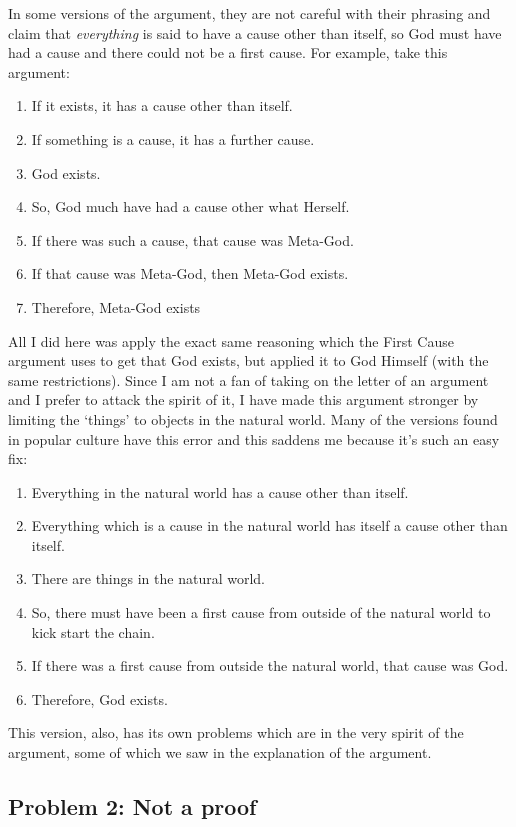 In some versions of the argument, they are not careful with their phrasing and claim that \emph{everything} is said to have a cause other than itself, so God must have had a cause and there could not be a first cause. For example, take this argument:
\begin{enumerate}
   \item If it exists, it has a cause other than itself.
   \item If something is a cause, it has a further cause.
   \item God exists.
   \item So, God much have had a cause other what Herself.
   \item If there was such a cause, that cause was Meta-God.
    \item If that cause was Meta-God, then Meta-God exists.
    \item Therefore, Meta-God exists
\end{enumerate}
All I did here was apply the exact same reasoning which the First Cause argument uses to get that God exists, but applied it to God Himself (with the same restrictions). Since I am not a fan of taking on the letter of an argument and I prefer to attack the spirit of it, I have made this argument stronger by limiting the `things' to objects in the natural world.  Many of the versions found in popular culture have this error and this saddens me because it's such an easy fix:
\begin{enumerate}
    \item Everything in the natural world has a cause other than itself.
    \item Everything which is a cause in the natural world has itself a cause other than itself.
    \item There are things in the natural world.
    \item So, there must have been a first cause from outside of the natural world to kick start the chain.
    \item If there was a first cause from outside the natural world, that cause was God.
    \item Therefore, God exists.
\end{enumerate}
This version, also, has its own problems which are in the very spirit of the argument, some of which we saw in the explanation of the argument.
\subsection{Problem 2: Not a proof}

